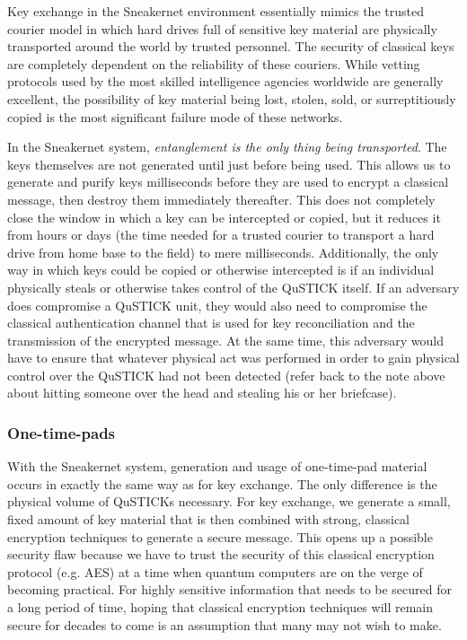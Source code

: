 \documentclass[twocolumn, aps, rmp, amsmath, amssymb, nofootinbib, superscriptaddress, longbibliography, floatfix, table-of-contents, eqsecnum]{revtex4-2}
\begin{document}
Key exchange in the Sneakernet environment essentially mimics the trusted courier model in which hard drives full of sensitive key material are physically transported around the world by trusted personnel. The security of classical keys are completely dependent on the reliability of these couriers. While vetting protocols used by the most skilled intelligence agencies worldwide are generally excellent, the possibility of key material being lost, stolen, sold, or surreptitiously copied is the most significant failure mode of these networks. 

In the Sneakernet system, \textit{entanglement is the only thing being transported}. The keys themselves are not generated until just before being used. This allows us to generate and purify keys milliseconds before they are used to encrypt a classical message, then destroy them immediately thereafter. This does not completely close the window in which a key can be intercepted or copied, but it reduces it from hours or days (the time needed for a trusted courier to transport a hard drive from home base to the field) to mere milliseconds. Additionally, the only way in which keys could be copied or otherwise intercepted is if an individual physically steals or otherwise takes control of the QuSTICK itself. If an adversary does compromise a QuSTICK unit, they would also need to compromise the classical authentication channel that is used for key reconciliation and the transmission of the encrypted message. At the same time, this adversary would have to ensure that whatever physical act was performed in order to gain physical control over the QuSTICK had not been detected (refer back to the note above about hitting someone over the head and stealing his or her briefcase). 

\subsubsection{One-time-pads}

With the Sneakernet system, generation and usage of one-time-pad material occurs in exactly the same way as for key exchange. The only difference is the physical volume of QuSTICKs necessary. For key exchange, we generate a small, fixed amount of key material that is then combined with strong, classical encryption techniques to generate a secure message. This opens up a possible security flaw because we have to trust the security of this classical encryption protocol (e.g. AES) at a time when quantum computers are on the verge of becoming practical. For highly sensitive information that needs to be secured for a long period of time, hoping that classical encryption techniques will remain secure for decades to come is an assumption that many may not wish to make. 
\end{document}
